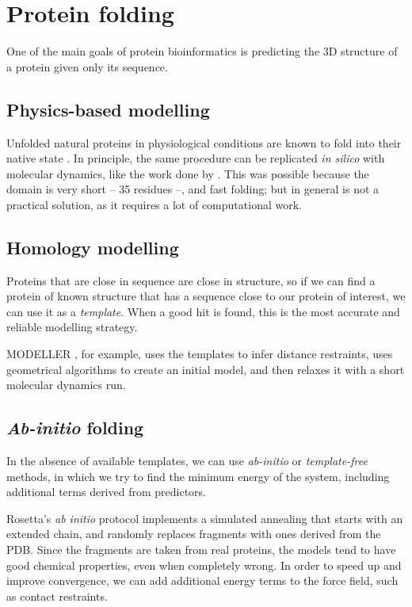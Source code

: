 
\section{Protein folding}

One of the main goals of protein bioinformatics is predicting the 3D structure of a protein given only its sequence.

\subsection{Physics-based modelling}
Unfolded natural proteins in physiological conditions are known to fold into their native state \citep{fold_graciously}.
In principle, the same procedure can be replicated \emph{in silico} with molecular dynamics, like the work done by \citet{physics_folding}.
This was possible because the domain is very short -- 35 residues --, and fast folding; but in general is not a practical solution, as it requires a lot of computational work.

\subsection{Homology modelling}
Proteins that are close in sequence are close in structure, so if we can find a protein of known structure that has a sequence close to our protein of interest, we can use it as a \emph{template}.
When a good hit is found, this is the most accurate and reliable modelling strategy.

MODELLER \citep{modeller}, for example, uses the templates to infer distance restraints, uses geometrical algorithms to create an initial model, and then relaxes it with a short molecular dynamics run.


\subsection{\emph{Ab-initio} folding}
In the absence of available templates, we can use \emph{ab-initio} or \emph{template-free} methods, in which we try to find the minimum energy of the system, including additional terms derived from predictors.

Rosetta's \citep{Rosetta3}  \emph{ab initio} protocol implements a simulated annealing that starts with an extended chain, and randomly replaces fragments with ones derived from the PDB.
Since the fragments are taken from real proteins, the models tend to have good chemical properties, even when completely wrong.
In order to speed up and improve convergence, we can add additional energy terms to the force field, such as contact restraints.


